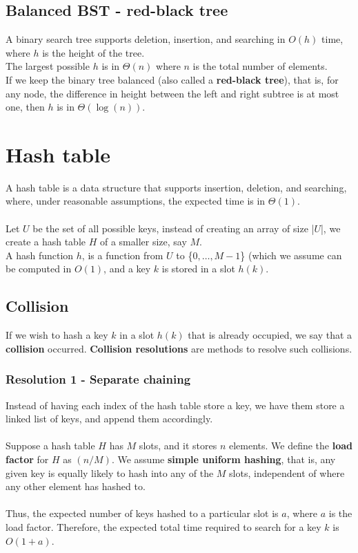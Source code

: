\documentclass[a4paper]{article}
\begin{document}
\subsection{Balanced BST - red-black tree}
A binary search tree supports deletion, insertion, and searching in $O(h)$ time, where $h$ is the height of the tree.\\
The largest possible $h$ is in $\Theta(n)$ where $n$ is the total number of elements.\\
If we keep the binary tree balanced (also called a \textbf{red-black tree}), that is, for any node, the difference in height between the left and right subtree is at most one, then $h$ is in $\Theta(\log(n))$.

\section{Hash table}
A hash table is a data structure that supports insertion, deletion, and searching, where, under reasonable assumptions, the expected time is in $\Theta(1)$.\\ \\
Let $U$ be the set of all possible keys, instead of creating an array of size |$U$|, we create a hash table $H$ of a smaller size, say $M$.\\
A hash function $h$, is a function from $U$ to \{$0,\dots,M-1$\} (which we assume can be computed in $O(1)$, and a key $k$ is stored in a slot $h(k)$.
\subsection{Collision}
If we wish to hash a key $k$ in a slot $h(k)$ that is already occupied, we say that a \textbf{collision} occurred. \textbf{Collision resolutions} are methods to resolve such collisions.
\subsubsection{Resolution 1 - Separate chaining}
Instead of having each index of the hash table store a key, we have them store a linked list of keys, and append them accordingly.\\\\
Suppose a hash table $H$ has $M$ slots, and it stores $n$ elements. We define the \textbf{load factor} for $H$ as $(n/M)$. We assume \textbf{simple uniform hashing}, that is, any given key is equally likely to hash into any of the $M$ slots, independent of where any other element has hashed to.\\\\
Thus, the expected number of keys hashed to a particular slot is $a$, where $a$ is the load factor. Therefore, the expected total time required to search for a key $k$ is $O(1+a)$.
\end{document}
